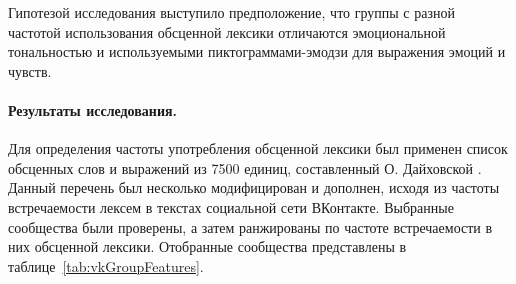 Гипотезой исследования выступило предположение, что группы с разной частотой использования обсценной лексики отличаются эмоциональной тональностью и используемыми пиктограммами-эмодзи для выражения эмоций и чувств. 

\paragraph{Результаты исследования.} Для определения частоты употребления обсценной лексики был применен список обсценных слов и выражений из 7500 единиц, составленный О. Дайховской . Данный перечень был несколько модифицирован и дополнен, исходя из частоты встречаемости лексем в текстах социальной сети ВКонтакте. Выбранные сообщества были проверены, а затем ранжированы по частоте встречаемости в них обсценной лексики. Отобранные сообщества представлены в таблице~\cref{tab:vkGroupFeatures}.

